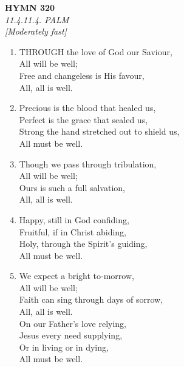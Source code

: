\newpage
\begin{center}
    {\Large \textbf{HYMN 320}}
    \\
    \textit{11.4.11.4. PALM}
    \\
    \textit{\small [Moderately fast]}
\end{center}
\vspace{1em}

\begin{enumerate}
    \item THROUGH the love of God our Saviour, \\
        All will be well; \\
        Free and changeless is His favour, \\
        All, all is well.

    \item Precious is the blood that healed us, \\
        Perfect is the grace that sealed us, \\
        Strong the hand stretched out to shield us, \\
        All must be well.

    \item Though we pass through tribulation, \\
        All will be well; \\
        Ours is such a full salvation, \\
        All, all is well.

    \item Happy, still in God confiding, \\
        Fruitful, if in Christ abiding, \\
        Holy, through the Spirit's guiding, \\
        All must be well.

    \item We expect a bright to-morrow, \\
        All will be well; \\
        Faith can sing through days of sorrow, \\
        All, all is well. \\
        On our Father's love relying, \\
        Jesus every need supplying, \\
        Or in living or in dying, \\
        All must be well.

\end{enumerate}

